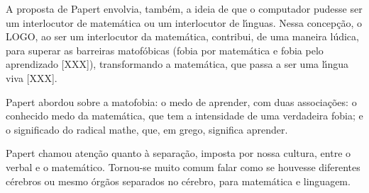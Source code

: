 \documentclass[
12pt,		%
openright,	%
twoside,  %
a4paper,			%
chapter=TITLE,		%
english,			%
french,				%
spanish,			%
brazil				%
]{USPSC-classe/USPSC}
\begin{document}
A proposta de Papert envolvia, tamb\'em, a ideia de que o computador pudesse ser um interlocutor  de matem\'atica ou um interlocutor de l\'{\i}nguas. Nessa concep\c{c}\~ao, o LOGO, ao ser um interlocutor da matem\'atica, contribui, de uma maneira l\'udica, para superar as barreiras matof\'obicas (fobia por matem\'atica e fobia pelo aprendizado [XXX]), transformando a matem\'atica, que passa a ser uma l\'{\i}ngua viva [XXX].










Papert abordou sobre a \textquotedbl matofobia: o medo de aprender\textquotedbl , com duas associa\c{c}\~oes: o conhecido medo da matem\'atica, que tem a intensidade de uma verdadeira fobia; e o  significado do radical mathe, que, em grego, significa aprender.











\noindent\begin{center}\mbox{\centering{}}\end{center}


Papert chamou aten\c{c}\~ao quanto \`a separa\c{c}\~ao, imposta por nossa cultura, entre o verbal e o matem\'atico. Tornou-se muito comum falar como se houvesse diferentes c\'erebros ou mesmo \'org\~aos separados no c\'erebro, para matem\'atica e linguagem.
\end{document}
